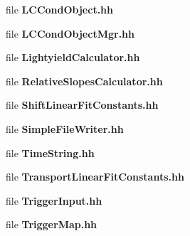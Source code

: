 \begin{DoxyCompactItemize}
\item 
file {\bfseries L\-C\-Cond\-Object.\-hh}
\item 
file {\bfseries L\-C\-Cond\-Object\-Mgr.\-hh}
\item 
file {\bf Lightyield\-Calculator.\-hh}
\item 
file {\bf Relative\-Slopes\-Calculator.\-hh}
\item 
file {\bf Shift\-Linear\-Fit\-Constants.\-hh}
\item 
file {\bfseries Simple\-File\-Writer.\-hh}
\item 
file {\bfseries Time\-String.\-hh}
\item 
file {\bf Transport\-Linear\-Fit\-Constants.\-hh}
\item 
file {\bfseries Trigger\-Input.\-hh}
\item 
file {\bfseries Trigger\-Map.\-hh}
\end{DoxyCompactItemize}
